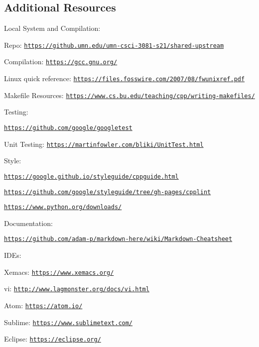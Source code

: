 \subsection*{Additional Resources}

Local System and Compilation\+:
\begin{DoxyItemize}
\item Repo\+: \href{https://github.umn.edu/umn-csci-3081-s21/shared-upstream}{\tt https\+://github.\+umn.\+edu/umn-\/csci-\/3081-\/s21/shared-\/upstream}
\item Compilation\+: \href{https://gcc.gnu.org/}{\tt https\+://gcc.\+gnu.\+org/}
\item Linux quick reference\+: \href{https://files.fosswire.com/2007/08/fwunixref.pdf}{\tt https\+://files.\+fosswire.\+com/2007/08/fwunixref.\+pdf}
\item Makefile Resources\+: \href{https://www.cs.bu.edu/teaching/cpp/writing-makefiles/}{\tt https\+://www.\+cs.\+bu.\+edu/teaching/cpp/writing-\/makefiles/}
\end{DoxyItemize}

Testing\+:
\begin{DoxyItemize}
\item \href{https://github.com/google/googletest}{\tt https\+://github.\+com/google/googletest}
\item Unit Testing\+: \href{https://martinfowler.com/bliki/UnitTest.html}{\tt https\+://martinfowler.\+com/bliki/\+Unit\+Test.\+html}
\end{DoxyItemize}

Style\+:
\begin{DoxyItemize}
\item \href{https://google.github.io/styleguide/cppguide.html}{\tt https\+://google.\+github.\+io/styleguide/cppguide.\+html}
\item \href{https://github.com/google/styleguide/tree/gh-pages/cpplint}{\tt https\+://github.\+com/google/styleguide/tree/gh-\/pages/cpplint}
\item \href{https://www.python.org/downloads/}{\tt https\+://www.\+python.\+org/downloads/}
\end{DoxyItemize}

Documentation\+:
\begin{DoxyItemize}
\item \href{https://github.com/adam-p/markdown-here/wiki/Markdown-Cheatsheet}{\tt https\+://github.\+com/adam-\/p/markdown-\/here/wiki/\+Markdown-\/\+Cheatsheet}
\end{DoxyItemize}

I\+D\+Es\+:
\begin{DoxyItemize}
\item Xemacs\+: \href{https://www.xemacs.org/}{\tt https\+://www.\+xemacs.\+org/}
\item vi\+: \href{http://www.lagmonster.org/docs/vi.html}{\tt http\+://www.\+lagmonster.\+org/docs/vi.\+html}
\item Atom\+: \href{https://atom.io/}{\tt https\+://atom.\+io/}
\item Sublime\+: \href{https://www.sublimetext.com/}{\tt https\+://www.\+sublimetext.\+com/}
\item Eclipse\+: \href{https://eclipse.org/}{\tt https\+://eclipse.\+org/} 
\end{DoxyItemize}